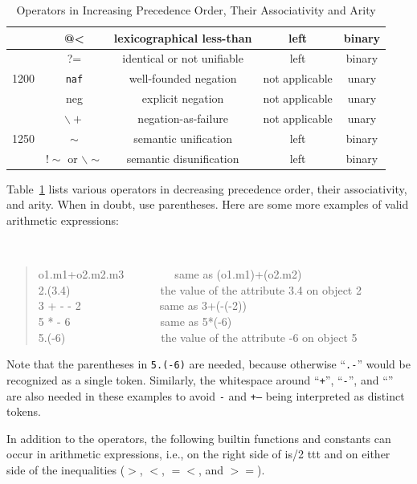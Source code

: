 \documentclass[11pt]{article}
\newcommand{\SILKNAF}{{{\tt naf}}\xspace}
\begin{document}
\begin{table}[tb]
{\begin{tabular}{|c|c|c|c|c|}
            & @< & lexicographical less-than & left & binary \\ \hline
            & ?= & identical or not unifiable & left & binary \\ \hline
1200        & \SILKNAF & well-founded negation & not applicable & unary \\ \cline{2-5}
            & neg & explicit negation & not applicable & unary \\ \cline{2-5}
            & $\backslash+$ & negation-as-failure & not applicable & unary \\ \hline
1250        & $\sim$ & semantic unification & left & binary \\ \cline{2-5}
            & $!\sim$ or $\backslash\sim$ & semantic disunification & left & binary \\ \cline{2-5}
\hline
\end{tabular}
}
\caption{Operators in Increasing Precedence Order, Their Associativity and Arity}
\label{tab:tab-op-pre}
\end{table}

Table~\ref{tab:tab-op-pre} lists various operators in decreasing precedence
order, their associativity, and arity.  When in doubt, use parentheses.
Here are some more examples of valid arithmetic expressions:
{\tt
\begin{quote}
o1.m1+o2.m2.m3~~~~~~~~~{\rm same as} (o1.m1)+(o2.m2)\\
2.(3.4)~~~~~~~~~~~~~~~~{\rm the value of the attribute} 3.4 {\rm on object} 2\\
3 + - - 2~~~~~~~~~~~~~~{\rm same as} 3+(-(-2))\\
5 * - 6~~~~~~~~~~~~~~~~{\rm same as} 5*(-6)\\
5.(-6)~~~~~~~~~~~~~~~~~{\rm the value of the attribute} -6 {\rm on object} 5
\end{quote}
}
Note that the parentheses in {\tt 5.(-6)} are needed,
because otherwise ``{\tt .-}'' would be recognized as a single token.
Similarly, the whitespace around ``{\tt +}'', ``{\tt -}'', and ``{\tt *}''
are also needed in these examples to avoid {\tt *-} and {\tt +--} being
interpreted as distinct tokens.

In addition to the operators, the following builtin functions and constants
can occur in arithmetic expressions, i.e., on the right side of is/2
ttt and on either side of the inequalities ($>$, $<$, $=<$, and $>=$).
\end{document}
